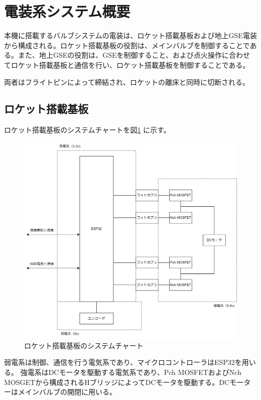 \documentclass[dvipdfmx,a4j]{jsarticle}
\begin{document}
\section{電装系システム概要}

本機に搭載するバルブシステムの電装は、ロケット搭載基板および地上GSE電装から構成される。ロケット搭載基板の役割は、メインバルブを制御することである。また、地上GSEの役割は、GSEを制御すること、および点火操作に合わせてロケット搭載基板と通信を行い、ロケット搭載基板を制御することである。

両者はフライトピンによって締結され、ロケットの離床と同時に切断される。

\subsection{ロケット搭載基板}

ロケット搭載基板のシステムチャートを図\ref{newGenPropulsionBRDChart} に示す。

\begin{figure}[htbp]
    \centering
    \includegraphics[width = 15cm]{figures/newGenPropulsionBRDChart.drawio.png}
    \caption{ロケット搭載基板のシステムチャート}
    \label{newGenPropulsionBRDChart}
\end{figure}

弱電系は制御、通信を行う電気系であり、マイクロコントローラはESP32を用いる。
強電系はDCモータを駆動する電気系であり、Pch MOSFETおよびNch MOSGETから構成されるHブリッジによってDCモータを駆動する。DCモーターはメインバルブの開閉に用いる。
\end{document}
